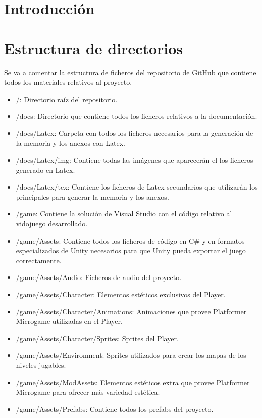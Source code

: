 
\section{Introducción}

\section{Estructura de directorios}
Se va a comentar la estructura de ficheros del repositorio de GitHub que contiene todos los materiales relativos al proyecto.

\begin{itemize}
\item
/: Directorio raíz del repositorio.
\item
/docs: Directorio que contiene todos los ficheros relativos a la documentación.
\item
/docs/Latex: Carpeta con todos los ficheros necesarios para la generación de la memoria y los anexos con Latex.
\item
/docs/Latex/img: Contiene todas las imágenes que aparecerán el los ficheros generado en Latex.
\item
/docs/Latex/tex: Contiene los ficheros de Latex secundarios que utilizarán los principales para generar la memoria y los anexos.
\item
/game: Contiene la solución de Visual Studio con el código relativo al vidojuego desarrollado.
\item
/game/Assets: Contiene todos los ficheros de código en C\# y en formatos especializados de Unity necesarios para que Unity pueda exportar el juego correctamente.
\item
/game/Assets/Audio: Ficheros de audio del proyecto.
\item
/game/Assets/Character: Elementos estéticos exclusivos del Player.
\item
/game/Assets/Character/Animations: Animaciones que provee Platformer Microgame utilizadas en el Player.
\item
/game/Assets/Character/Sprites: Sprites del Player.
\item
/game/Assets/Environment: Sprites utilizados para crear los mapas de los niveles jugables.
\item
/game/Assets/ModAssets: Elementos estéticos extra que provee Platformer Microgame para ofrecer más variedad estética.
\item
/game/Assets/Prefabs: Contiene todos los prefabs del proyecto.

\end{itemize}
